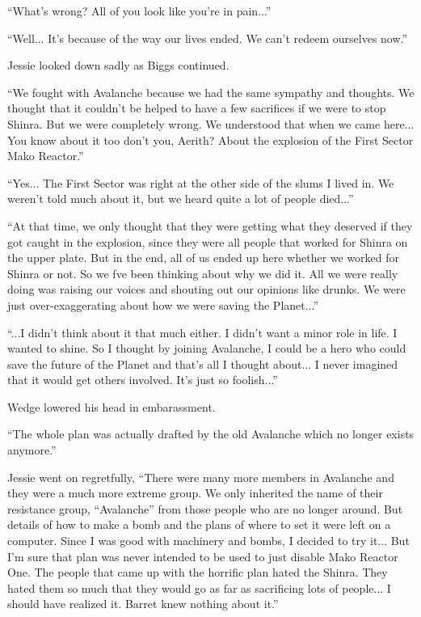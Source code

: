 \documentclass[oneside]{book}
\begin{document}
“What's wrong? All of you look like you're in pain...”

“Well... It's because of the way our lives ended. We can't redeem ourselves now.”

Jessie looked down sadly as Biggs continued.

“We fought with Avalanche because we had the same sympathy and thoughts. We thought that it couldn't be helped to have a few sacrifices if we were to stop Shinra. But we were completely wrong. We understood that when we came here... You know about it too don't you, Aerith? About the explosion of the First Sector Mako Reactor.”

“Yes... The First Sector was right at the other side of the slums I lived in. We weren't told much about it, but we heard quite a lot of people died...”

“At that time, we only thought that they were getting what they deserved if they got caught in the explosion, since they were all people that worked for Shinra on the upper plate. But in the end, all of us ended up here whether we worked for Shinra or not. So we fve been thinking about why we did it. All we were really doing was raising our voices and shouting out our opinions like drunks. We were just over-exaggerating about how we were saving the Planet...”

“...I didn't think about it that much either. I didn't want a minor role in life. I wanted to shine. So I thought by joining Avalanche, I could be a hero who could save the future of the Planet and that's all I thought about... I never imagined that it would get others involved. It's just so foolish...”

Wedge lowered his head in embarassment.

“The whole plan was actually drafted by the old Avalanche which no longer exists anymore.”

Jessie went on regretfully, “There were many more members in Avalanche and they were a much more extreme group. We only inherited the name of their resistance group, “Avalanche” from those people who are no longer around. But details of how to make a bomb and the plans of where to set it were left on a computer. Since I was good with machinery and bombs, I decided to try it... But I'm sure that plan was never intended to be used to just disable Mako Reactor One. The people that came up with the horrific plan hated the Shinra. They hated them so much that they would go as far as sacrificing lots of people... I should have realized it. Barret knew nothing about it.”
\end{document}
